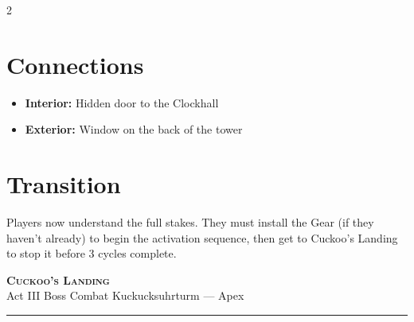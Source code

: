 \documentclass[10pt,letterpaper]{article}
\newcommand{\sceneheader}[4]{%
  \fancyhead[L]{\small\textcolor{accent}{\scshape #1}}%
  \fancyhead[R]{\small\textcolor{accent}{#2 \quad \textbullet \quad #3}}%
  \begin{center}
  {\LARGE\bfseries\scshape\textcolor{accent}{#1}}\\[2pt]
  {\small #2 \quad \textbullet \quad #3 \quad \textbullet \quad #4}\\[2pt]
  \textcolor{rulecol}{\rule{0.5\textwidth}{0.8pt}}
  \end{center}
  \vspace{-4pt}
}
\begin{document}
\begin{multicols}{2}
\section*{Connections}
\begin{itemize}
\item \textbf{Interior:} Hidden door to the Clockhall
\item \textbf{Exterior:} Window on the back of the tower
\end{itemize}

\section*{Transition}
Players now understand the full stakes. They must install the Gear (if they haven't already) to begin the activation sequence, then get to Cuckoo's Landing to stop it before 3 cycles complete.

\end{multicols}

\newpage


\label{sec:cuckoo}\sceneheader{Cuckoo's Landing}{Act III}{Boss Combat}{Kuckucksuhrturm --- Apex}
\end{document}
